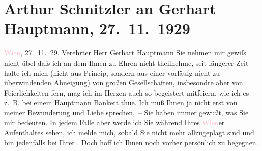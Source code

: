 

               \section[Arthur Schnitzler an Gerhart Hauptmann, 27. 11. 1929]{ Arthur Schnitzler an Gerhart Hauptmann, 27. 11. 1929}\nopagebreak{}\rehead{ }\normalsize\beginnumbering{} \toendnotes[C]{\smallbreak\pagebreak[2]} 
\toendnotes[C]{\smallbreak}\pstart
           \raggedleft{}{\pb}\textcolor{pink}{Wien}{}\ledrightnote{\textcolor{pink}{Wien}}, 27. 11. 29.\pend
           \pstart{}Verehrter Herr Gerhart Hauptmann\pend\pstart
           Sie nehmen mir gewiſs nicht übel daſs ich an dem \label{K_L02526_1v}\label{K_L02526_1h} Ihnen zu Ehren nicht theilnehme, seit
               längerer Zeit halte ich mich (nicht aus Princip, sondern aus einer vorläufg nicht zu
               überwindenden Abneigung) von großen Gesellschaften, insbesondre aber von
               Feierlichkeiten fern, mag ich im Herzen auch so begeistert mitfeiern, wie ich es
               z. B. bei einem Hauptmann Bankett thue. Ich muß Ihnen ja nicht erst von meiner
               Bewunderung und Liebe sprechen, – Sie haben immer gewußt, was Sie {\pb}mir bedeuten. \pend
           \pstart
           In jedem Falle aber werde ich Sie während Ihres \textcolor{pink}{Wien}{}\ledrightnote{\textcolor{pink}{Wien}}er Aufenthaltes sehen, ich melde mich, sobald Sie nicht mehr allzugeplagt
               sind und bin jedenfalls bei Ihrer \label{K_L02526_2v}\label{K_L02526_2h}. Doch hoff ich Ihnen noch vorher persönlich zu begegnen.\pend
